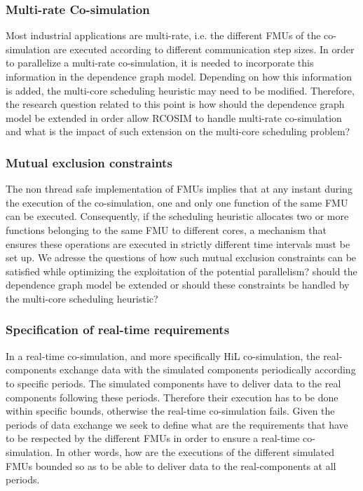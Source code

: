 \subsubsection{Multi-rate Co-simulation}

Most industrial applications are multi-rate, i.e. the different FMUs of the co-simulation are executed according to different communication step sizes. In order to parallelize a multi-rate co-simulation, it is needed to incorporate this information in the dependence graph model. Depending on how this information is added, the multi-core scheduling heuristic may need to be modified. Therefore, the research question related to this point is how should the dependence graph model be extended in order allow RCOSIM to handle multi-rate co-simulation and what is the impact of such extension on the multi-core scheduling problem?

\subsubsection{Mutual exclusion constraints}

The non thread safe implementation of FMUs implies that at any instant during the execution of the co-simulation, one and only one function of the same FMU can be executed. Consequently, if the scheduling heuristic allocates two or more functions belonging to the same FMU to different cores, a mechanism that ensures these operations are executed in strictly different time intervals must be set up. We adresse the questions of how such mutual exclusion constraints can be satisfied while optimizing the exploitation of the potential parallelism? should the dependence graph model be extended or should these constraints be handled by the multi-core scheduling heuristic?

\subsubsection{Specification of real-time requirements}

In a real-time co-simulation, and more specifically HiL co-simulation, the real-components exchange data with the simulated components periodically according to specific periods. The simulated components have to deliver data to the real components following these periods. Therefore their execution has to be done within specific bounds, otherwise the real-time co-simulation fails. Given the periods of data exchange we seek to define what are the requirements that have to be respected by the different FMUs in order to ensure a real-time co-simulation. In other words, how are the executions of the different simulated FMUs bounded so as to be able to deliver data to the real-components at all periods.

